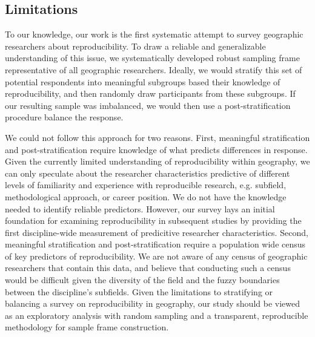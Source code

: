 \documentclass[]{interact}
\theoremstyle{plain}%
\theoremstyle{definition}
\theoremstyle{remark}
\begin{document}
\subsection*{Limitations}
To our knowledge, our work is the first systematic attempt to survey geographic researchers about reproducibility. 
To draw a reliable and generalizable understanding of this issue, we systematically developed robust sampling frame representative of all geographic researchers. 
Ideally, we would stratify this set of potential respondents into meaningful subgroups based their knowledge of reproducibility, and then randomly draw participants from these subgroups. 
If our resulting sample was imbalanced, we would then use a post-stratification procedure balance the response.   

We could not follow this approach for two reasons. 
First, meaningful stratification and post-stratification require knowledge of what predicts differences in response.
Given the currently limited understanding of reproducibility within geography, we can only speculate about the researcher characteristics predictive of different levels of familiarity and experience with reproducible research, e.g. subfield, methodological approach, or career position.
We do not have the knowledge needed to identify reliable predictors.
However, our survey lays an initial foundation for examining reproducibility in subsequent studies by providing the first discipline-wide measurement of predicitive researcher characteristics. 
Second, meaningful stratification and post-stratification require a population wide census of key predictors of reproducibility.
We are not aware of any census of geographic researchers that contain this data, and believe that conducting such a census would be difficult given the diversity of the field and the fuzzy boundaries between the discipline's subfields.
Given the limitations to stratifying or balancing a survey on reproducibility in geography, our study should be viewed as an exploratory analysis with random sampling and a transparent, reproducible methodology for sample frame construction.
\end{document}
